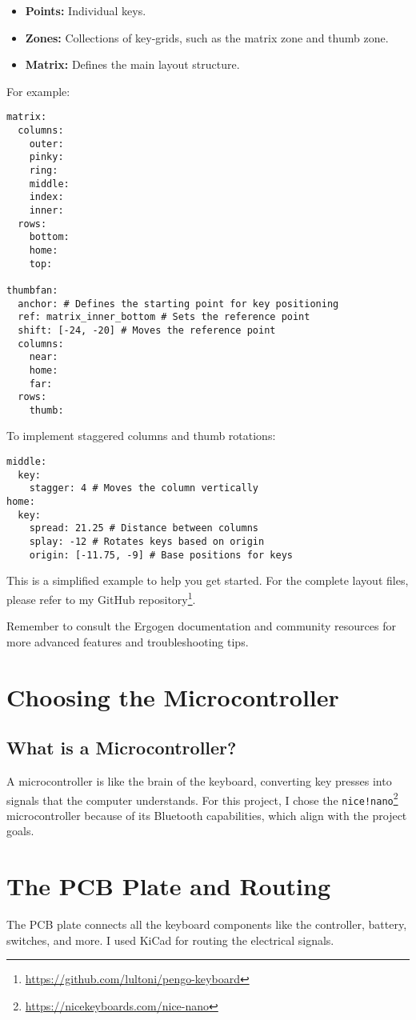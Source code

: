 \documentclass[a4paper,12pt]{article}
\begin{document}
\begin{itemize}
    \item \textbf{Points:} Individual keys.
    \item \textbf{Zones:} Collections of key-grids, such as the matrix zone and thumb zone.
    \item \textbf{Matrix:} Defines the main layout structure.
\end{itemize}

For example:
\begin{verbatim}
matrix:
  columns:
    outer:
    pinky:
    ring:
    middle:
    index:
    inner:
  rows:
    bottom:
    home:
    top:
    
thumbfan:
  anchor: # Defines the starting point for key positioning
  ref: matrix_inner_bottom # Sets the reference point
  shift: [-24, -20] # Moves the reference point
  columns:
    near:
    home:
    far:
  rows:
    thumb:
\end{verbatim}

To implement staggered columns and thumb rotations:
\begin{verbatim}
middle:
  key:
    stagger: 4 # Moves the column vertically
home:
  key:
    spread: 21.25 # Distance between columns
    splay: -12 # Rotates keys based on origin
    origin: [-11.75, -9] # Base positions for keys
\end{verbatim}

This is a simplified example to help you get started. For the complete layout files, please refer to my GitHub repository\footnote{\url{https://github.com/lultoni/pengo-keyboard}}.

Remember to consult the Ergogen documentation and community resources for more advanced features and troubleshooting tips.

\section{Choosing the Microcontroller}
\subsection{What is a Microcontroller?}
A microcontroller is like the brain of the keyboard, converting key presses into signals that the computer understands. For this project, I chose the \texttt{nice!nano}\footnote{\url{https://nicekeyboards.com/nice-nano}} microcontroller because of its Bluetooth capabilities, which align with the project goals.

\section{The PCB Plate and Routing}
The PCB plate connects all the keyboard components like the controller, battery, switches, and more. I used KiCad for routing the electrical signals.
\end{document}

